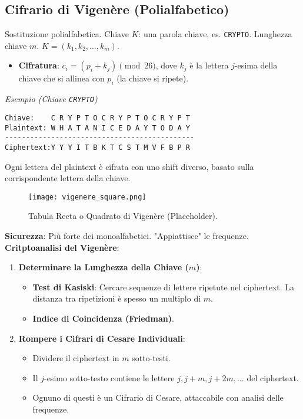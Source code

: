 \documentclass{article}
\begin{document}
\subsection{Cifrario di Vigenère (Polialfabetico)}
Sostituzione polialfabetica. Chiave $K$: una parola chiave, es. \texttt{CRYPTO}.
Lunghezza chiave $m$. $K = (k_1, k_2, \dots, k_m)$.
\begin{itemize}
    \item \textbf{Cifratura}: $c_i = (p_i + k_j) \pmod{26}$, dove $k_j$ è la lettera $j$-esima della chiave che si allinea con $p_i$ (la chiave si ripete).
\end{itemize}
\textit{Esempio (Chiave \texttt{CRYPTO})}
\begin{verbatim}
Chiave:    C R Y P T O C R Y P T O C R Y P T
Plaintext: W H A T A N I C E D A Y T O D A Y
---------------------------------------------
Ciphertext:Y Y Y I T B K T C S T M V F B P R
\end{verbatim}
Ogni lettera del plaintext è cifrata con uno shift diverso, basato sulla corrispondente lettera della chiave.
\begin{figure}[H]
    \centering
    \texttt{[image: vigenere\_square.png]} %
    \caption{Tabula Recta o Quadrato di Vigenère (Placeholder).}
    \label{fig:vigenere_square}
\end{figure}

\textbf{Sicurezza}: Più forte dei monoalfabetici. "Appiattisce" le frequenze.
\textbf{Critptoanalisi del Vigenère}:
\begin{enumerate}
    \item \textbf{Determinare la Lunghezza della Chiave ($m$)}:
    \begin{itemize}
        \item \textbf{Test di Kasiski}: Cercare sequenze di lettere ripetute nel ciphertext. La distanza tra ripetizioni è spesso un multiplo di $m$.
        \item \textbf{Indice di Coincidenza (Friedman)}.
    \end{itemize}
    \item \textbf{Rompere i Cifrari di Cesare Individuali}:
    \begin{itemize}
        \item Dividere il ciphertext in $m$ sotto-testi.
        \item Il $j$-esimo sotto-testo contiene le lettere $j, j+m, j+2m, \dots$ del ciphertext.
        \item Ognuno di questi è un Cifrario di Cesare, attaccabile con analisi delle frequenze.
    \end{itemize}
\end{enumerate}
\end{document}
